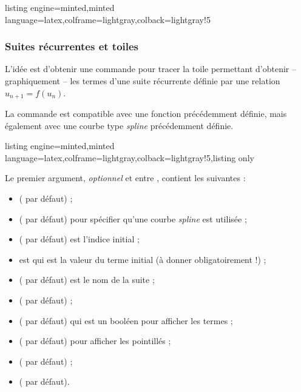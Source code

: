 \documentclass[11pt,a4paper]{ltxdoc}
\begin{document}
\begin{tcblisting}{listing engine=minted,minted language=latex,colframe=lightgray,colback=lightgray!5}
\begin{GraphiqueTikz}[Xmin=0,Xmax=12,Ymin=0,Ymax=5]
\end{GraphiqueTikz}
\end{tcblisting}

\pagebreak

\subsubsection{Suites récurrentes et toiles}\label{toilerecurr}

L'idée est d'obtenir une commande pour tracer la \og toile \fg{} permettant d'obtenir -- graphiquement -- les termes d'une suite récurrente définie par une relation $u_{n+1}=f(u_n)$.

La commande est compatible avec une fonction précédemment définie, mais également avec une courbe type \textit{spline} précédemment définie.

\begin{tcblisting}{listing engine=minted,minted language=latex,colframe=lightgray,colback=lightgray!5,listing only}
\end{tcblisting}

Le premier argument, \textit{optionnel} et entre \MontreCode{[...]}, contient les  suivantes :

\begin{itemize}
  \item {} ( par défaut) ;
  \item {} ( par défaut) pour spécifier qu'une courbe \textit{spline} est utilisée ;
  \item {} ( par défaut) est l'indice initial ;
  \item {} est qui est la valeur du terme initial (à donner obligatoirement !) ;
  \item {} ( par défaut) est le nom de la suite ;
  \item {} ( par défaut) ;
  \item {} ( par défaut) qui est un booléen pour afficher les termes ;
  \item {} ( par défaut) pour afficher les pointillés ;
  \item {} ( par défaut) ;
  \item {} ( par défaut).
\end{itemize}
\end{document}
